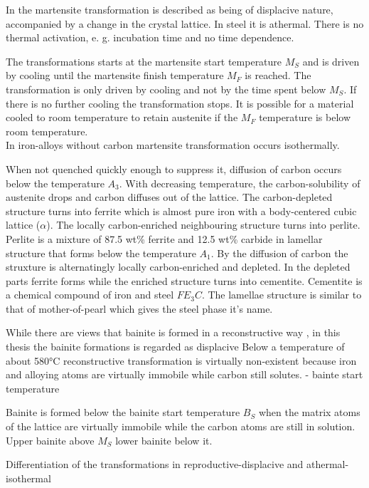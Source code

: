 In \cite{cohen_martensite_1992} the martensite transformation is described as being of displacive nature, accompanied by a change in the crystal lattice. In steel it is athermal. There is no thermal activation, e. g. incubation time and no time dependence. 

The transformations starts at the martensite start temperature $M_S$ and is driven by cooling until the martensite finish temperature $M_F$ is reached. The transformation is only driven by cooling and not by the time spent below $M_S$.  If there is no further cooling the transformation stops. It is possible for a material cooled to room temperature to retain austenite if the $M_F$ temperature is below room temperature. \\
In iron-alloys without carbon martensite transformation occurs isothermally. 

When not quenched quickly enough to suppress it, diffusion of carbon occurs below the temperature $A_3$. With decreasing temperature, the carbon-solubility of austenite drops and carbon diffuses out of the lattice. The carbon-depleted structure turns into ferrite which is almost pure iron with a body-centered cubic lattice ($\alpha$). The locally carbon-enriched neighbouring structure turns into perlite. Perlite is a mixture of 87.5 wt\% ferrite and 12.5 wt\% carbide in lamellar structure that forms below the temperature $A_1$. By the diffusion of carbon the struxture is alternatingly locally carbon-enriched and depleted. In the depleted parts ferrite forms while the enriched structure turns into cementite. Cementite is a chemical compound of iron and steel $FE_3C$. 
The lamellae structure is similar to that of mother-of-pearl which gives the steel phase it's name. 

While there are views that bainite is formed in a reconstructive way \cite{bhadeshia_bainite_1990}, in this thesis the bainite formations is regarded as displacive \cite{bhadeshia_bainite_2019}
Below a temperature of about 580°C reconstructive transformation is virtually non-existent because iron and alloying atoms are virtually immobile while carbon still solutes. \cite{christian_simple_1990} 
-\> bainte start temperature

Bainite is formed below the bainite start temperature $B_S$ when the matrix atoms of the lattice are virtually immobile while the carbon atoms are still in solution. 
Upper bainite above $M_S$ lower bainite below it. 

Differentiation of the transformations in reproductive-displacive and athermal-isothermal \cite{bhadeshia_bainite_1990} 


